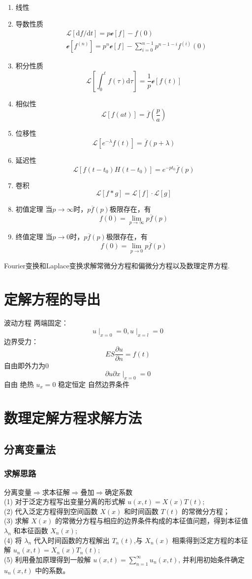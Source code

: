 \documentclass[11pt, a4paper, twoside]{ctexbook}
\begin{document}
\begin{enumerate}
    \item 线性
    \item 导数性质 $$\begin{aligned}&\mathscr{L}[\mathrm{d}f/\mathrm{d}t] = p\mathscr{e}[f] - f(0)\\&\mathscr{e}[f^{(n)}] = p^n\mathscr{e}[f] - \sum_{i= 0}^{n-1}p^{n-1-i}f^(i)(0)\end{aligned}$$
    \item 积分性质 $$\mathscr{L}[\int_0^t f(\tau)\mathrm{d}\tau] = \frac{1}{p}\mathscr{e}[f(t)]$$
    \item 相似性 $$\mathscr{L}[f(at)] = \overline{f}(\frac{p}{a})$$
    \item 位移性 $$\mathscr{L}[e^{-\lambda}f(t)] = \overline{f}(p+\lambda)$$
    \item 延迟性 $$\mathscr{L}[f(t-t_0)H(t-t_0)] = e^{-pt_0}\overline{f}(p)$$
    \item 卷积 $$\mathscr{L}[f*g] = \mathscr{L}[f]\cdot\mathscr{L}[g]$$
    \item 初值定理 当$p\to \infty$时，$p\overline{f}(p)$极限存在，有$$f(0) = \lim_{p \to \infty}p \overline{f}(p)$$
    \item 终值定理  当$p\to 0$时，$p\overline{f}(p)$极限存在，有 $$f(0) = \lim_{p \to 0}p \overline{f}(p)$$
\end{enumerate}
Fourier变换和Laplace变换求解常微分方程和偏微分方程以及数理定界方程.

\chapter{定解方程的导出}
波动方程
两端固定：
$$u\mid_{x = 0} = 0, u\mid_{x = l} = 0$$
边界受力：
$$ES\frac{\partial u}{\partial n}=f(t)$$
自由即外力为0
$${\partial u}{\partial x}\mid_{x = 0} = 0$$
自由
绝热 $u_x = 0$
稳定恒定
自然边界条件

\chapter{数理定解方程求解方法}
\section{分离变量法}
\subsection{求解思路}
分离变量$\Rightarrow$求本征解$\Rightarrow$叠加$\Rightarrow$确定系数\\
(1) 对于泛定方程写出变量分离的形式解 $u(x,t)=X(x)T(t);$\\
(2) 代入泛定方程得到空间函数 $X(x)$ 和时间函数 $T(t)$ 的常微分方程；\\
(3) 求解 $X(x)$ 的常微分方程与相应的边界条件构成的本征值问题，得到本征值 $\lambda_n$ 和本征函数 $X_n(x);$\\
(4) 将 $\lambda_n$ 代入时间函数的方程解出 $T_n(t)$,与 $X_n(x)$ 相乘得到泛定方程的本征解 $u_n(x,t)=X_n(x)T_n(t);$\\
(5) 利用叠加原理得到一般解 $u(x,t)=\sum_{n=1}^{\infty}u_n(x,t)$, 并利用初始条件确定 $u_n(x,t)$ 中的系数。\\
\end{document}
